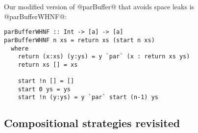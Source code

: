 \documentclass[twocolumn,9pt]{sigplanconf}
\begin{document}
Our modified version of @parBuffer@ that avoids space leaks is
@parBufferWHNF@:

\begin{verbatim}
parBufferWHNF :: Int -> [a] -> [a]
parBufferWHNF n xs = return xs (start n xs)
  where
    return (x:xs) (y:ys) = y `par` (x : return xs ys) 
    return xs [] = xs

    start !n [] = []
    start 0 ys = ys
    start !n (y:ys) = y `par` start (n-1) ys
\end{verbatim}


\subsection{Compositional strategies revisited}
\end{document}
